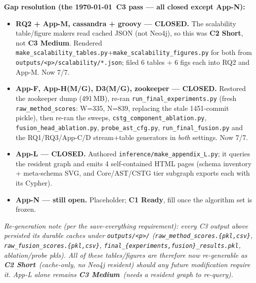 \documentclass[10pt]{article}
\providecommand{\code}[1]{\texttt{\small #1}}
\newcommand{\Cone}{\textcolor{green!50!black}{\textbf{C1 Ready}}}
\newcommand{\Ctwo}{\textcolor{blue!65!black}{\textbf{C2 Short}}}
\newcommand{\Cthree}{\textcolor{orange!85!black}{\textbf{C3 Medium}}}
\begin{document}
\medskip\noindent\textbf{Gap resolution (the \today\ C3 pass --- all closed except App-N):}
\begin{itemize}[leftmargin=1.5em,itemsep=1pt]
  \item \textbf{RQ2 + App-M, cassandra + groovy --- CLOSED.} The scalability
  table/figure makers read cached JSON (not Neo4j), so this was \Ctwo, not \Cthree.
  Rendered \code{make\_scalability\_tables.py}+\code{make\_scalability\_figures.py} for
  both from \code{outputs/<p>/scalability/*.json}; filed 6 tables + 6 figs each into
  RQ2 and App-M. Now 7/7.
  \item \textbf{App-F, App-H(M/G), D3(M/G), zookeeper --- CLOSED.} Restored the
  zookeeper dump (491\,MB), re-ran \code{run\_final\_experiments.py} (fresh
  \code{raw\_method\_scores}: W=335, N=839, replacing the stale 1451-commit pickle),
  then re-ran the sweeps, \code{cstg\_component\_ablation.py},
  \code{fusion\_head\_ablation.py}, \code{probe\_ast\_cfg.py}, \code{run\_final\_fusion.py}
  and the RQ1/RQ3/App-C/D stream+table generators in \emph{both} settings. Now 7/7.
  \item \textbf{App-L --- CLOSED.} Authored \code{inference/make\_appendix\_L.py}; it
  queries the resident graph and emits 4 self-contained HTML pages (schema inventory +
  meta-schema SVG, and Core/AST/CSTG tier subgraph exports each with its Cypher).
  \item \textbf{App-N --- still open.} Placeholder; \Cone, fill once the algorithm set
  is frozen.
\end{itemize}
\noindent\emph{Re-generation note (per the save-everything requirement): every C3
output above persisted its durable caches under \code{outputs/<p>/}
(\code{raw\_method\_scores.\{pkl,csv\}}, \code{raw\_fusion\_scores.\{pkl,csv\}},
\code{final\_\{experiments,fusion\}\_results.pkl}, ablation/probe pkls). All of these
tables/figures are therefore now re-generable as \Ctwo\ (cache-only, no Neo4j resident)
should any future modification require it. App-L alone remains \Cthree\ (needs a
resident graph to re-query).}
\end{document}
